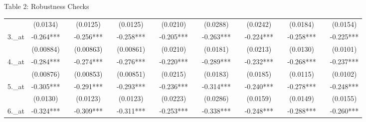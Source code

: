 \documentclass{beamer}
\begin{document}
\begin{frame}{Table 2: Robustness Checks}
\begin{table}[htbp]
\begin{adjustbox}{max width=\textwidth}
\begin{tabular}{llllllllllllllll}
          & \multicolumn{1}{c}{(0.0134)} &       & \multicolumn{1}{c}{(0.0125)} &       & \multicolumn{1}{c}{(0.0125)} &       & \multicolumn{1}{c}{(0.0210)} &       & \multicolumn{1}{c}{(0.0288)} &       & \multicolumn{1}{c}{(0.0242)} &       & \multicolumn{1}{c}{(0.0184)} &       & \multicolumn{1}{c}{(0.0154)} \\
    3.\_at & \multicolumn{1}{c}{-0.264***} &       & \multicolumn{1}{c}{-0.256***} &       & \multicolumn{1}{c}{-0.258***} &       & \multicolumn{1}{c}{-0.205***} &       & \multicolumn{1}{c}{-0.263***} &       & \multicolumn{1}{c}{-0.224***} &       & \multicolumn{1}{c}{-0.258***} &       & \multicolumn{1}{c}{-0.225***} \\
          & \multicolumn{1}{c}{(0.00884)} &       & \multicolumn{1}{c}{(0.00863)} &       & \multicolumn{1}{c}{(0.00861)} &       & \multicolumn{1}{c}{(0.0210)} &       & \multicolumn{1}{c}{(0.0181)} &       & \multicolumn{1}{c}{(0.0213)} &       & \multicolumn{1}{c}{(0.0130)} &       & \multicolumn{1}{c}{(0.0101)} \\
    4.\_at & \multicolumn{1}{c}{-0.284***} &       & \multicolumn{1}{c}{-0.274***} &       & \multicolumn{1}{c}{-0.276***} &       & \multicolumn{1}{c}{-0.220***} &       & \multicolumn{1}{c}{-0.289***} &       & \multicolumn{1}{c}{-0.232***} &       & \multicolumn{1}{c}{-0.268***} &       & \multicolumn{1}{c}{-0.237***} \\
          & \multicolumn{1}{c}{(0.00876)} &       & \multicolumn{1}{c}{(0.00853)} &       & \multicolumn{1}{c}{(0.00851)} &       & \multicolumn{1}{c}{(0.0215)} &       & \multicolumn{1}{c}{(0.0183)} &       & \multicolumn{1}{c}{(0.0185)} &       & \multicolumn{1}{c}{(0.0115)} &       & \multicolumn{1}{c}{(0.0102)} \\
    5.\_at & \multicolumn{1}{c}{-0.305***} &       & \multicolumn{1}{c}{-0.291***} &       & \multicolumn{1}{c}{-0.293***} &       & \multicolumn{1}{c}{-0.236***} &       & \multicolumn{1}{c}{-0.314***} &       & \multicolumn{1}{c}{-0.240***} &       & \multicolumn{1}{c}{-0.278***} &       & \multicolumn{1}{c}{-0.248***} \\
          & \multicolumn{1}{c}{(0.0130)} &       & \multicolumn{1}{c}{(0.0123)} &       & \multicolumn{1}{c}{(0.0123)} &       & \multicolumn{1}{c}{(0.0223)} &       & \multicolumn{1}{c}{(0.0286)} &       & \multicolumn{1}{c}{(0.0159)} &       & \multicolumn{1}{c}{(0.0149)} &       & \multicolumn{1}{c}{(0.0155)} \\
    6.\_at & \multicolumn{1}{c}{-0.324***} &       & \multicolumn{1}{c}{-0.309***} &       & \multicolumn{1}{c}{-0.311***} &       & \multicolumn{1}{c}{-0.253***} &       & \multicolumn{1}{c}{-0.338***} &       & \multicolumn{1}{c}{-0.248***} &       & \multicolumn{1}{c}{-0.288***} &       & \multicolumn{1}{c}{-0.260***} \\

\end{tabular}
\end{adjustbox}
\end{table}
\end{frame}
\end{document}
